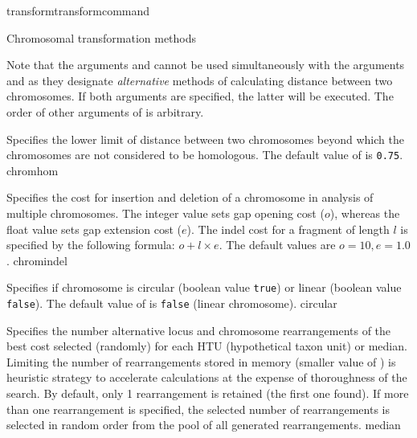 \begin{command}{transform}{transformcommand}
\begin{arguments}
\begin{argumentgroup}{Chromosomal transformation methods}
\begin{description}
       
                   \begin{statement}
  		Note that the arguments  and  cannot be used
		simultaneously with the arguments  and 
		as they designate \emph{alternative} methods of calculating distance between two chromosomes.
		If both arguments are specified, the latter will be executed. The order of other arguments of
		 is arbitrary. 
		\end{statement}

                       {Specifies the lower limit of distance between two chromosomes
                        beyond which the chromosomes are not considered to be
                        homologous. The default value of 
                        is \texttt{0.75}.}
                        {chromhom}
                        
                        {Specifies the cost for insertion and deletion of a chromosome in analysis of
                        multiple chromosomes. The integer value sets gap opening
                        cost ($o$), whereas the float value sets gap extension
                        cost ($e$).  The indel cost for a fragment of length $l$ is
                        specified by the following formula:
                       $o + l \times e$. The default values are $o=10, e=1.0$.}
                        {chromindel}
 
                        {Specifies if chromosome is circular (boolean value 
                        \texttt{true}) or linear (boolean value \texttt{false}).
                        The default value of  is
                        \texttt{false} (linear chromosome).}
                        {circular}

       		      
                        {Specifies the number alternative locus and chromosome
                        rearrangements of the best cost selected (randomly) for
                        each HTU (hypothetical taxon unit) or median. Limiting the number of rearrangements
                        stored in memory (smaller value of )
                        is heuristic strategy to accelerate calculations at the
                        expense of thoroughness of the search. By default, only 1
                        rearrangement is retained (the first one found). If more than
                        one rearrangement is specified, the selected number of
                        rearrangements is selected in random order from the pool of
                        all generated rearrangements.}
                        {median}


\end{description}
\end{argumentgroup}
\end{arguments}
\end{command}
